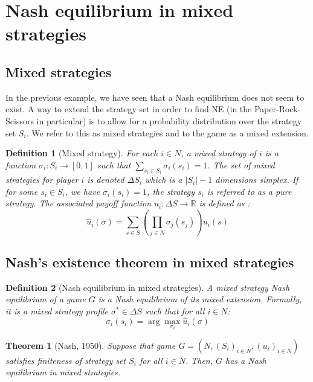 \documentclass[12pt]{report}
\newtheorem{theorem}{Theorem}[chapter]
\newtheorem{definition}{Definition}[chapter]
\begin{document}
\section{Nash equilibrium in mixed strategies}

\subsection{Mixed strategies}


In the previous example, we have seen that a Nash equilibrium does not seem to exist. A way to extend the strategy set in order to find NE (in the Paper-Rock-Scissors in particular) is to allow for a probability distribution over the strategy set $S_i$. We refer to this as mixed strategies and to the game as a mixed extension.

\begin{definition}[Mixed strategy]
For each $i\in N$, a mixed strategy of $i$ is a function $\sigma_i : S_i \to [0,1]$ such that $\sum_{s_i\in S_i}\sigma_i(s_i) = 1$. The set of mixed strategies for player $i$ is denoted $\Delta S_i$ which is a $\vert S_i\vert - 1$ dimensions simplex. If for some $s_i\in S_i$, we have $\sigma_i(s_i) = 1$, the strategy $s_i$ is referred to as a pure strategy. The associated payoff function $u_i:\Delta S\to \mathbb{R}$ is defined as : $$\hat u_i(\sigma) = \sum_{s\in S}\left(\prod_{j\in N} \sigma_j(s_j)\right)u_i(s) $$
\end{definition}

\subsection{Nash's existence theorem in mixed strategies}

\begin{definition}[Nash equilibrium in mixed strategies]
A mixed strategy Nash equilibrium of a game $G$ is a Nash equilibrium of its mixed extension. Formally, it is a mixed strategy profile $\sigma^*\in \Delta S$ such that for all $i\in N$: $$\sigma_i(s_i) = \operatorname{arg}\max_{\sigma_i} \hat u_i(\sigma) $$
\end{definition}

\begin{theorem}[Nash, 1950]
Suppose that game $G = (N, (S_i)_{i\in N}, (u_i)_{i\in N})$ satisfies finiteness of strategy set $S_i$ for all $i\in N$. Then, $G$ has a Nash equilibrium in mixed strategies.
\end{theorem}
\end{document}
